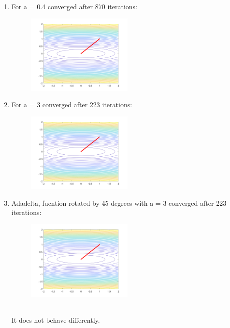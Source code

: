 \documentclass{article}
\begin{document}
\begin{enumerate}
    \item For a = 0.4 converged after 870 iterations:
          \begin{figure}[h]
            \centering
            \includegraphics[width=0.5\textwidth]{problem80.4.png}      
          \end{figure}
    \item For a = 3 converged after 223 iterations:
          \begin{figure}[h]
            \centering
            \includegraphics[width=0.5\textwidth]{problem83.png}            
          \end{figure} 
          \newpage
    \item Adadelta, fucntion rotated by 45 degrees with a = 3 converged after 223 iterations:
          \begin{figure}[h]
            \centering
            \includegraphics[width=0.5\textwidth]{problem8rotated.png}            
          \end{figure} 
          \noindent \\It does not behave differently. 
            
\end{enumerate}
\end{document}
